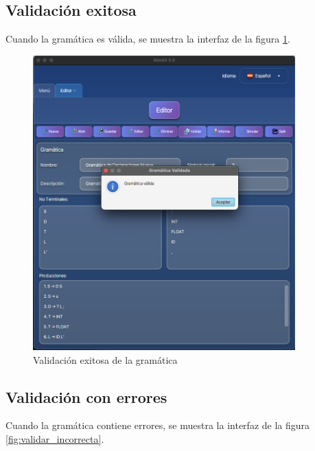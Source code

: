 \subsection{Validación exitosa}

Cuando la gramática es válida, se muestra la interfaz de la figura \ref{fig:validar_correcta}.

\needspace{8cm}
\begin{figure}[H]
    \centering
    \includegraphics[width=0.9\textwidth]{figuras/editor/validar.png}
    \caption{Validación exitosa de la gramática}
    \label{fig:validar_correcta}
\end{figure}

\subsection{Validación con errores}

Cuando la gramática contiene errores, se muestra la interfaz de la figura \ref{fig:validar_incorrecta}.

